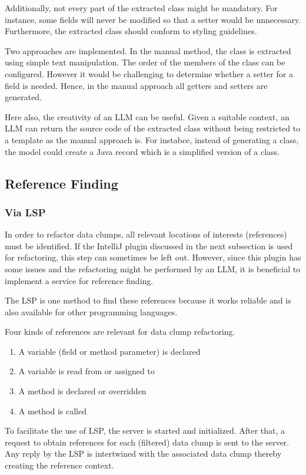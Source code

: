 Additionally, not every part of the extracted class might be mandatory. For instance, some fields will never be modified so that a setter would be unnecessary. Furthermore, the extracted class should conform to styling guidelines. 

Two approaches are implemented. In the manual method, the class is extracted using simple text manipulation. The order of the members of the class can be configured.  However it would be challenging to determine whether a setter for a field is needed. Hence, in the manual approach all getters and setters are generated.

Here also, the creativity of an \ac{LLM} can be useful. Given a suitable context, an \ac{LLM} can return the source code of the extracted class without being restricted to a template as the manual approach is. For instabce, instead of generating a class, the model could create a Java record which is a simplified version of a class. 

\subsection{Reference Finding}


\subsubsection{Via \ac{LSP}}
In order to refactor data clumps, all relevant locations of interests (references) must be identified. If the IntelliJ plugin discussed in the next subsection is used for refactoring, this step can sometimes be left out. However, since this plugin has some issues and the refactoring might be performed by an \ac{LLM}, it is beneficial to implement a service for reference finding. 

The \ac{LSP} is one method to find these references because it works reliable and is also available for other programming languages.

Four kinds of references are relevant for data clump refactoring.

\begin{enumerate}
     \item A  variable (field or method parameter)  is declared
    \item A variable is read from or assigned to
   
    \item A method is declared or overridden
    \item A method is called
\end{enumerate}
To facilitate the use of \ac{LSP}, the server is started and initialized. After that, a request to obtain references for each (filtered) data clump is sent to the server.
Any reply by the \ac{LSP} is intertwined with the associated data clump thereby creating the reference context.

